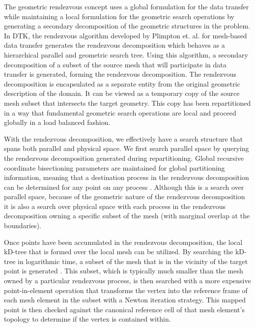 \documentclass{mc2013}
\begin{document}
\label{subsec:rendezvous_algorithm}

The geometric rendezvous concept uses a global formulation for the
data transfer while maintaining a local formulation for the geometric
search operations by generating a secondary decomposition of the
geometric structures in the problem. In DTK, the rendezvous algorithm
developed by Plimpton et. al. \cite{Plimpton_2004} for mesh-based data
transfer generates the rendezvous decomposition which behaves as a
hierarchical parallel and geometric search tree.  Using this
algorithm, a secondary decomposition of a subset of the source mesh
that will participate in data transfer is generated, forming the
rendezvous decomposition. The rendezvous decomposition is encapsulated
as a separate entity from the original geometric description of the
domain. It can be viewed as a temporary copy of the source mesh subset
that intersects the target geometry. This copy has been repartitioned
in a way that fundamental geometric search operations are local and
proceed globally in a load balanced fashion.

With the rendezvous decomposition, we effectively have a search
structure that spans both parallel and physical space. We first search
parallel space by querying the rendezvous decomposition generated
during repartitioning. Global recursive coordinate bisectioning
parameters are maintained for global partitioning information, meaning
that a destination process in the rendezvous decomposition can be
determined for any point on any process \cite{Berger_1987}. Although
this is a search over parallel space, because of the geometric nature
of the rendezvous decomposition it is also a search over physical
space with each process in the rendezvous decomposition owning a
specific subset of the mesh (with marginal overlap at the boundaries).
 
Once points have been accumulated in the rendezvous decomposition, the
local kD-tree that is formed over the local mesh can be utilized. By
searching the kD-tree in logarithmic time, a subset of the mesh that
is in the vicinity of the target point is generated
\cite{Bentley_1975}. This subset, which is typically much smaller than
the mesh owned by a particular rendezvous process, is then searched
with a more expensive point-in-element operation that transforms the
vertex into the reference frame of each mesh element in the subset
with a Newton iteration strategy. This mapped point is then checked
against the canonical reference cell of that mesh element's topology
to determine if the vertex is contained within.
\end{document}
